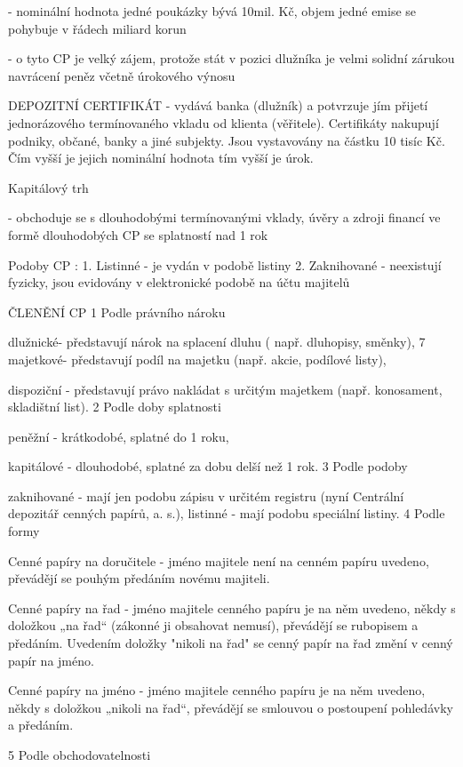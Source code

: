 - nominální hodnota jedné poukázky bývá 10mil. Kč, objem jedné emise se pohybuje v řádech miliard korun

- o tyto CP je velký zájem, protože stát v pozici dlužníka je velmi solidní zárukou navrácení peněz včetně úrokového výnosu

DEPOZITNÍ CERTIFIKÁT
- vydává banka (dlužník) a potvrzuje jím přijetí jednorázového termínovaného vkladu od klienta (věřitele). Certifikáty nakupují
podniky, občané, banky a jiné subjekty. Jsou vystavovány na částku 10 tisíc Kč. Čím vyšší je jejich nominální hodnota tím vyšší je úrok.

Kapitálový trh

- obchoduje se s dlouhodobými termínovanými vklady, úvěry a zdroji financí ve formě dlouhodobých CP se splatností nad 1 rok

Podoby CP : 1. Listinné - je vydán v podobě listiny
2. Zaknihované - neexistují fyzicky, jsou evidovány v elektronické podobě na účtu majitelů

ČLENĚNÍ CP
1 Podle právního nároku

dlužnické- představují nárok na splacení dluhu ( např. dluhopisy, směnky),
7 majetkové- představují podíl na majetku (např. akcie, podílové listy),

dispoziční - představují právo nakládat s určitým majetkem (např. konosament, skladištní list).
2 Podle doby splatnosti

peněžní - krátkodobé, splatné do 1 roku,

kapitálové - dlouhodobé, splatné za dobu delší než 1 rok.
3 Podle podoby

zaknihované - mají jen podobu zápisu v určitém registru (nyní Centrální depozitář cenných papírů, a. s.),
listinné - mají podobu speciální listiny.
4 Podle formy

Cenné papíry na doručitele - jméno majitele není na cenném papíru uvedeno, převádějí se pouhým předáním novému majiteli.

Cenné papíry na řad - jméno majitele cenného papíru je na něm uvedeno, někdy s doložkou „na řad“ (zákonné ji obsahovat nemusí),
převádějí se rubopisem a předáním. Uvedením doložky "nikoli na řad" se cenný papír na řad změní v cenný papír na jméno.

Cenné papíry na jméno - jméno majitele cenného papíru je na něm uvedeno, někdy s doložkou „nikoli na řad“, převádějí se smlouvou o
postoupení pohledávky a předáním.

5 Podle obchodovatelnosti



